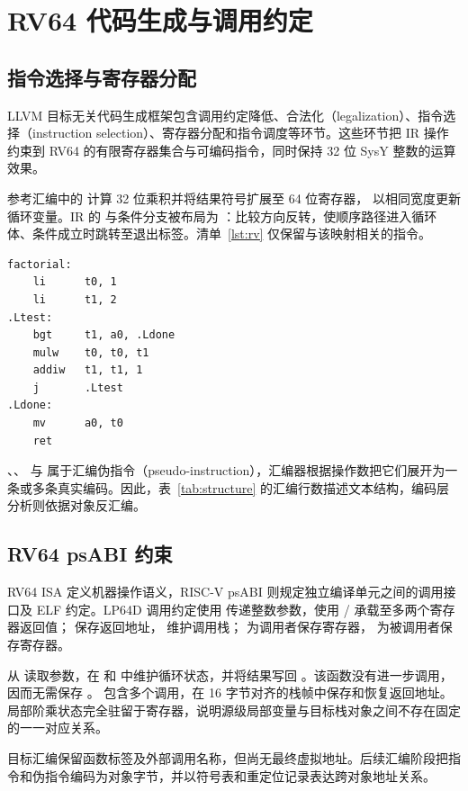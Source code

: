 \section{RV64 代码生成与调用约定}
\label{sec:rv64}

\subsection{指令选择与寄存器分配}

LLVM 目标无关代码生成框架包含调用约定降低、合法化（legalization）、指令选择（instruction selection）、寄存器分配和指令调度等环节\cite{llvm-codegen-2026,llvm-globalisel-2026}。这些环节把 IR 操作约束到 RV64 的有限寄存器集合与可编码指令，同时保持 32 位 SysY 整数的运算效果。

参考汇编中的  计算 32 位乘积并将结果符号扩展至 64 位寄存器， 以相同宽度更新循环变量。IR 的  与条件分支被布局为 ：比较方向反转，使顺序路径进入循环体、条件成立时跳转至退出标签。清单~\ref{lst:rv} 仅保留与该映射相关的指令。

\begin{center}
\begin{minipage}{0.92\linewidth}
\begin{lstlisting}[caption={参考 RV64 汇编中的阶乘循环。},label={lst:rv}]
factorial:
    li      t0, 1
    li      t1, 2
.Ltest:
    bgt     t1, a0, .Ldone
    mulw    t0, t0, t1
    addiw   t1, t1, 1
    j       .Ltest
.Ldone:
    mv      a0, t0
    ret
\end{lstlisting}
\end{minipage}
\end{center}

、、 与  属于汇编伪指令（pseudo-instruction），汇编器根据操作数把它们展开为一条或多条真实编码。因此，表~\ref{tab:structure} 的汇编行数描述文本结构，编码层分析则依据对象反汇编。

\subsection{RV64 psABI 约束}

RV64 ISA 定义机器操作语义，RISC-V psABI 则规定独立编译单元之间的调用接口及 ELF 约定\cite{riscv-isa-2026,riscv-psabi-1.0}。LP64D 调用约定使用  传递整数参数，使用 / 承载至多两个寄存器返回值； 保存返回地址， 维护调用栈； 为调用者保存寄存器， 为被调用者保存寄存器。

 从  读取参数，在  和  中维护循环状态，并将结果写回 。该函数没有进一步调用，因而无需保存 。 包含多个调用，在 16 字节对齐的栈帧中保存和恢复返回地址。局部阶乘状态完全驻留于寄存器，说明源级局部变量与目标栈对象之间不存在固定的一一对应关系。

目标汇编保留函数标签及外部调用名称，但尚无最终虚拟地址。后续汇编阶段把指令和伪指令编码为对象字节，并以符号表和重定位记录表达跨对象地址关系。
